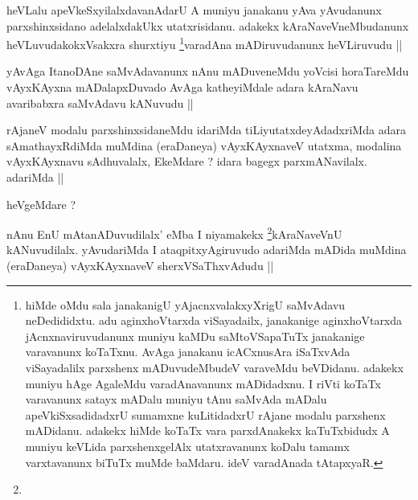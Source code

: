 
\begin{artha}
heVLalu apeVkeSxyilalxdavanAdarU A muniyu janakanu yAva yAvudanunx parxshinxsidano adelalxdakUkx utatxrisidanu. adakekx kAraNaveVneMbudanunx heVLuvudakokxVsakxra shurxtiyu \footnote{hiMde oMdu sala janakanigU yAjacnxvalakxyXrigU saMvAdavu neDedididxtu. adu aginxhoVtarxda viSayadailx, janakanige aginxhoVtarxda jAcnxnaviruvudanunx muniyu kaMDu saMtoVSapaTuTx janakanige varavanunx koTaTxnu. AvAga janakanu icACxnusAra iSaTxvAda viSayadalilx parxshenx mADuvudeMbudeV varaveMdu beVDidanu. adakekx muniyu hAge AgaleMdu varadAnavanunx mADidadxnu. I riVti koTaTx varavanunx satayx mADalu muniyu tAnu saMvAda mADalu apeVkiSxsadidadxrU sumamxne kuLitidadxrU rAjane modalu parxshenx mADidanu. adakekx hiMde koTaTx vara parxdAnakekx kaTuTxbidudx A muniyu keVLida parxshenxgelAlx utatxravanunx koDalu tamamx varxtavanunx biTuTx muMde baMdaru. ideV varadAnada tAtapxyaR.}varadAna mADiruvudanunx heVLiruvudu ||
\end{artha}

\begin{artha}
yAvAga ItanoDAne saMvAdavanunx nAnu mADuveneMdu yoVcisi horaTareMdu vAyxKAyxna mADalapxDuvado AvAga katheyiMdale adara kAraNavu avaribabxra saMvAdavu kANuvudu ||
\end{artha}


\begin{artha}
rAjaneV modalu parxshinxsidaneMdu idariMda tiLiyutatxdeyAdadxriMda adara sAmathayxRdiMda muMdina (eraDaneya) vAyxKAyxnaveV utatxma, modalina vAyxKAyxnavu sAdhuvalalx, EkeMdare ? idara bagegx parxmANavilalx. adariMda ||
\end{artha}

\begin{artha}
heVgeMdare ?
\end{artha}

\begin{artha}
nAnu EnU mAtanADuvudilalx' eMba I niyamakekx \footnote{}kAraNaveVnU kANuvudilalx. yAvudariMda I ataqpitxyAgiruvudo adariMda mADida muMdina (eraDaneya) vAyxKAyxnaveV sherxVSaThxvAdudu ||
\end{artha}


